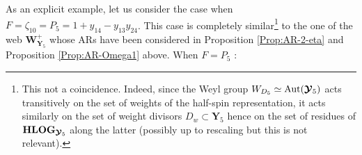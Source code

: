 \documentclass[11pt]{amsart}
\begin{document}
As an explicit example, let us consider the case when  $F=\zeta_{10}=P_5=1+y_{14}-y_{13}y_{24}$.  This case is completely similar\footnote{This not a coincidence. Indeed, since the Weyl group $W_{D_5}\simeq {\rm Aut}( \boldsymbol{\mathcal Y}_5)$ acts transitively on the set of weights of the half-spin representation, it acts similarly on the set of weight divisors $D_w\subset \boldsymbol{Y}_5$ hence on the set of residues of 
${\bf HLOG}_ {\boldsymbol{\mathcal Y}_5}$ along the latter (possibly up to rescaling but this is not relevant).} to the one of the web $\boldsymbol{W}_{\boldsymbol{Y}_5}^+$ whose ARs have been considered in 
Proposition \ref{Prop:AR-2-eta} and Proposition \ref{Prop:AR-Omega1} above. 
When $F=P_5$ : 
\end{document}
